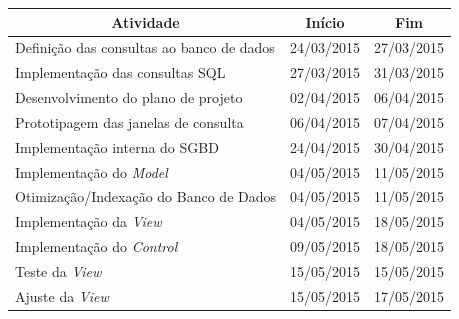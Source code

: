 \documentclass[a4paper,12pt]{article}
\begin{document}
{\normalsize %


\begin{longtable}{|l|c|c|}
\hline
\multicolumn{1}{|c|}{\textbf{Atividade}}  & \multicolumn{1}{c|}{\textbf{Início}} & \multicolumn{1}{c|}{\textbf{Fim}} \\ \hline


Definição das consultas ao banco de dados & 24/03/2015                           & 27/03/2015                        \\ \hline


Implementação das consultas SQL           & 27/03/2015                           & 31/03/2015                        \\ \hline


Desenvolvimento do plano de projeto       & 02/04/2015                           & 06/04/2015                        \\ \hline


Prototipagem das janelas de consulta      & 06/04/2015                           & 07/04/2015                        \\ \hline


Implementação interna do SGBD             & 24/04/2015                           & 30/04/2015                        \\ \hline


Implementação do \textit{Model}           & 04/05/2015                           & 11/05/2015                        \\ \hline


Otimização/Indexação do Banco de Dados    & 04/05/2015                           & 11/05/2015                        \\ \hline


Implementação da \textit{View}            & 04/05/2015                           & 18/05/2015                        \\ \hline


Implementação do \textit{Control}         & 09/05/2015                           & 18/05/2015                        \\ \hline


Teste da \textit{View}                    & 15/05/2015                           & 15/05/2015                        \\ \hline


Ajuste da \textit{View}                   & 15/05/2015                           & 17/05/2015                        \\ \hline



\end{longtable}}
\end{document}
